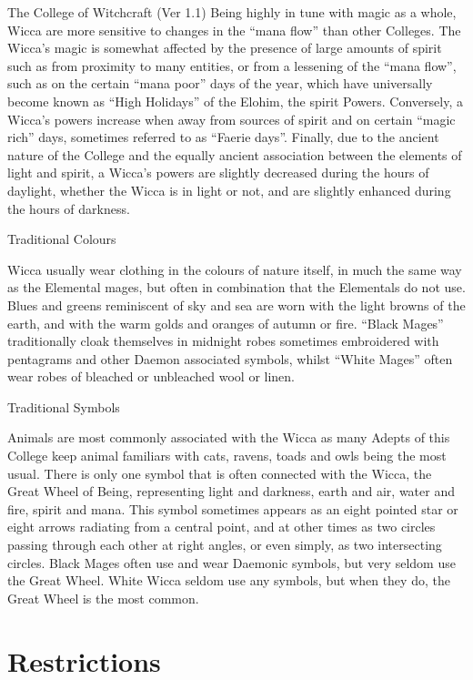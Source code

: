 \begin{Chapter}{The College of Witchcraft (Ver 1.1)}
Being highly in tune with magic as a whole, Wicca are more sensitive
to changes in the “mana flow” than other Colleges.  The Wicca’s magic
is somewhat affected by the presence of large amounts of spirit such
as from proximity to many entities, or from a lessening of the “mana
flow”, such as on the certain “mana poor” days of the year, which have
universally become known as “High Holidays” of the Elohim, the spirit
Powers. Conversely, a Wicca’s powers increase when away from sources
of spirit and on certain “magic rich” days, sometimes referred to as
“Faerie days”.  Finally, due to the ancient nature of the College and
the equally ancient association between the elements of light and
spirit, a Wicca’s powers are slightly decreased during the hours of
daylight, whether the Wicca is in light or not, and are slightly
enhanced during the hours of darkness.

Traditional Colours 

Wicca usually wear clothing in the colours of nature itself, in much
the same way as the Elemental mages, but often in combination that the
Elementals do not use.  Blues and greens reminiscent of sky and sea
are worn with the light browns of the earth, and with the warm golds
and oranges of autumn or fire.  “Black Mages” traditionally cloak
themselves in midnight robes sometimes embroidered with pentagrams and
other Daemon associated symbols, whilst “White Mages” often wear robes
of bleached or unbleached wool or linen.

Traditional Symbols 

Animals are most commonly associated with the Wicca as many Adepts of
this College keep animal familiars with cats, ravens, toads and owls
being the most usual.  There is only one symbol that is often
connected with the Wicca, the Great Wheel of Being, representing light
and darkness, earth and air, water and fire, spirit and mana.  This
symbol sometimes appears as an eight pointed star or eight arrows
radiating from a central point, and at other times as two circles
passing through each other at right angles, or even simply, as two
intersecting circles. Black Mages often use and wear Daemonic symbols,
but very seldom use the Great Wheel.  White Wicca seldom use any
symbols, but when they do, the Great Wheel is the most common.


\section{Restrictions}


\end{Chapter}
